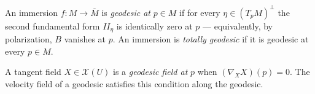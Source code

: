 \begin{definition}
  \label{def:dc-ch6-2-8-geodesic}


  An immersion $f:M\to\overline{M}$ is \emph{geodesic at} $p\in M$ if for every
  $\eta\in(T_pM)^\perp$ the second fundamental form $\mathit{II}_\eta$ is
  identically zero at $p$ — equivalently, by polarization, $B$ vanishes at $p$.
  An immersion is \emph{totally geodesic} if it is geodesic at every
  $p\in M$.
\end{definition}

\begin{definition}
  \label{def:dc-ch6-2-9-geodesic-field}


  A tangent field $X\in\mathcal{X}(U)$ is a \emph{geodesic field at} $p$ when
  $(\nabla_X X)(p)=0$. The velocity field of a geodesic satisfies this condition
  along the geodesic.
\end{definition}

